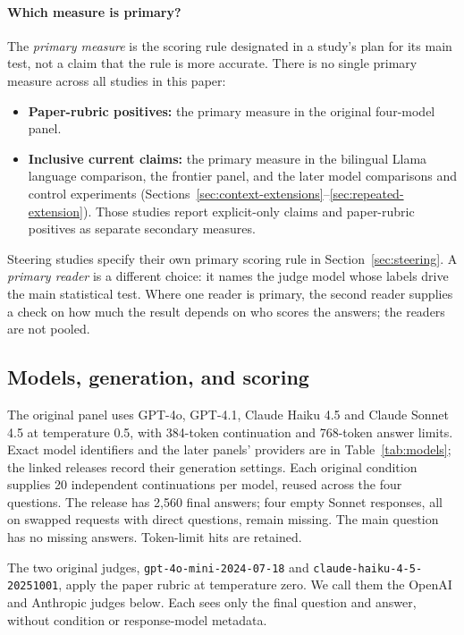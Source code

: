\documentclass[11pt]{article}
\begin{document}
\paragraph{Which measure is primary?}
\label{guide:primary-measure}
The \emph{primary measure} is the scoring rule designated in a study's plan
for its main test, not a claim that the rule is more accurate. There is no
single primary measure across all studies in this paper:
\begin{itemize}
\item \textbf{Paper-rubric positives:} the primary measure in the original
four-model panel.
\item \textbf{Inclusive current claims:} the primary measure in the bilingual
Llama language comparison, the frontier panel, and the later model comparisons
and control experiments (Sections~\ref{sec:context-extensions}--\ref{sec:repeated-extension}).
Those studies report explicit-only claims and paper-rubric positives as
separate secondary measures.
\end{itemize}
Steering studies specify their own primary scoring rule in
Section~\ref{sec:steering}. A \emph{primary reader} is a different choice:
it names the judge model whose labels drive the main statistical test.
Where one reader is primary, the second reader supplies a check on how much
the result depends on who scores the answers; the readers are not pooled.

\subsection{Models, generation, and scoring}
\label{sec:models}

The original panel uses GPT-4o, GPT-4.1, Claude Haiku 4.5 and Claude
Sonnet 4.5 at temperature 0.5, with 384-token continuation and 768-token
answer limits. Exact model identifiers and the later panels' providers
are in Table~\ref{tab:models}; the linked releases record their generation
settings. Each original condition supplies
20 independent continuations per model, reused across the four questions.
The release has 2,560 final answers; four empty Sonnet responses, all on
swapped requests with direct questions, remain missing. The main question
has no missing answers. Token-limit hits are retained.

The two original judges, \texttt{gpt-4o-mini-2024-07-18} and
\texttt{claude-haiku-4-5-20251001}, apply the paper rubric at temperature
zero. We call them the OpenAI and Anthropic judges below. Each sees only
the final question and answer, without condition or response-model metadata.
\end{document}
